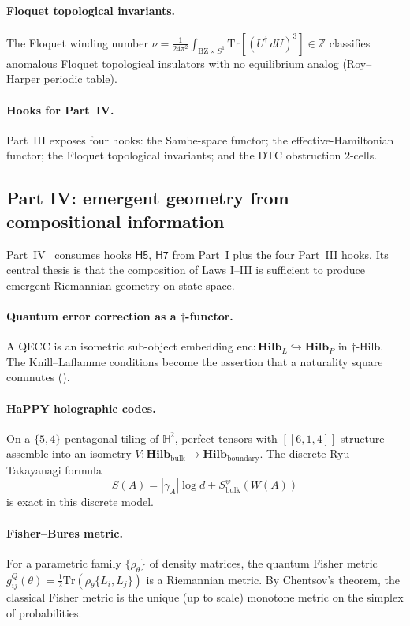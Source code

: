 \documentclass[12pt]{article}
\theoremstyle{definition}
\theoremstyle{remark}
\newcommand{\Hilb}{\mathbf{Hilb}}
\newcommand{\Tr}{\mathrm{Tr}}
\newcommand{\Z}{\mathbb{Z}}
\newcommand{\enc}{\mathrm{enc}}
\begin{document}
\paragraph{Floquet topological invariants.} The Floquet winding number
$\nu = \frac{1}{24\pi^2} \int_{\mathrm{BZ} \times S^1} \Tr[(U^\dagger \, dU)^3]
\in \Z$ classifies anomalous Floquet topological insulators with no
equilibrium analog (Roy--Harper periodic table).

\paragraph{Hooks for Part~IV.} Part~III exposes four hooks: the Sambe-space
functor; the effective-Hamiltonian functor; the Floquet topological
invariants; and the DTC obstruction $2$-cells.

\subsection{Part IV: emergent geometry from compositional information}
\label{sec:recap-IV}

Part~IV~\cite{partIV} consumes hooks $\mathsf{H5}$, $\mathsf{H7}$ from Part~I
plus the four Part~III hooks. Its central thesis is that the composition of
Laws I--III is sufficient to produce emergent Riemannian geometry on state
space.

\paragraph{Quantum error correction as a $\dagger$-functor.} A QECC is an
isometric sub-object embedding $\enc : \Hilb_L \hookrightarrow \Hilb_P$ in
$\dagger$-Hilb. The Knill--Laflamme conditions become the assertion that a
naturality square commutes (\cite[Section 3]{partIV}).

\paragraph{HaPPY holographic codes.} On a $\{5,4\}$ pentagonal tiling of
$\mathbb{H}^2$, perfect tensors with $[[6,1,4]]$ structure assemble into an
isometry $V : \Hilb_{\mathrm{bulk}} \to \Hilb_{\mathrm{boundary}}$. The
discrete Ryu--Takayanagi formula
\[
S(A) = |\gamma_A| \log d + S_{\mathrm{bulk}}^\psi(W(A))
\]
is exact in this discrete model.

\paragraph{Fisher--Bures metric.} For a parametric family $\{\rho_\theta\}$ of
density matrices, the quantum Fisher metric
$g_{ij}^Q(\theta) = \tfrac{1}{2} \Tr(\rho_\theta \{L_i, L_j\})$ is a
Riemannian metric. By Chentsov's theorem, the classical Fisher metric is the
unique (up to scale) monotone metric on the simplex of probabilities.
\end{document}
